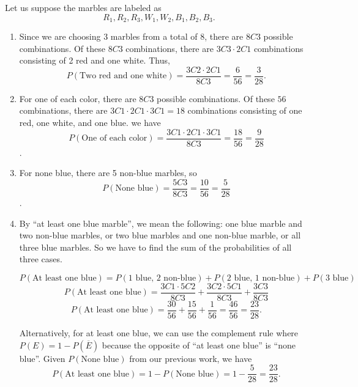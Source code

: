 \begin{solution}
    Let us suppose the marbles are labeled as \[ R_1, R_2, R_3, W_1, W_2, B_1, B_2, B_3. \]
    \begin{enumerate}
        \item Since we are choosing 3 marbles from a total of 8, there are \( 8C3 \) possible combinations. Of these \( 8C3 \) combinations, there are \( 3C3 \cdot 2C1 \) combinations consisting of 2 red and one white. Thus,
              \[ P(\text{Two red and one white}) = \frac{3C2 \cdot 2C1}{8C3} = \frac{6}{56} = \frac{3}{28}. \]

        \item For one of each color, there are \( 8C3 \) possible combinations. Of these $56$ combinations, there are $3C1 \cdot 2C1 \cdot 3C1 = 18$ combinations consisting of one red, one white, and one blue.  we have
              \[ P(\text{One of each color}) = \frac{3C1 \cdot 2C1 \cdot 3C1}{8C3} = \frac{18}{56} = \frac{9}{28}\].

        \item For none blue, there are 5 non-blue marbles, so \[ P(\text{None blue}) = \frac{5C3}{8C3} = \frac{10}{56}= \frac{5}{28}\].

        \item By ``at least one blue marble'', we mean the following: one blue marble and two non-blue marbles, or two blue marbles and one non-blue marble, or all three blue marbles. So we have to find the sum of the probabilities of all three cases.

              \[
                  P(\text{At least one blue}) = P(1 \text{ blue, } 2 \text{ non-blue}) + P(2 \text{ blue, } 1 \text{ non-blue}) + P(3 \text{ blue})
              \]
              \[
                  P(\text{At least one blue}) = \frac{3C1 \cdot 5C2}{8C3} + \frac{3C2 \cdot 5C1}{8C3} + \frac{3C3}{8C3}
              \]
              \[
                  P(\text{At least one blue}) = \frac{30}{56} + \frac{15}{56} + \frac{1}{56} = \frac{46}{56} = \frac{23}{28}.
              \]

              Alternatively, for at least one blue, we can use the complement rule where \( P(E) = 1 - P(\overline{E}) \) because the opposite of ``at least one blue'' is ``none blue''. Given \( P(\text{None blue}) \) from our previous work, we have \[ P(\text{At least one blue}) = 1 - P(\text{None blue}) = 1- \frac{5}{28} = \frac{23}{28}.\]
    \end{enumerate}
\end{solution}

